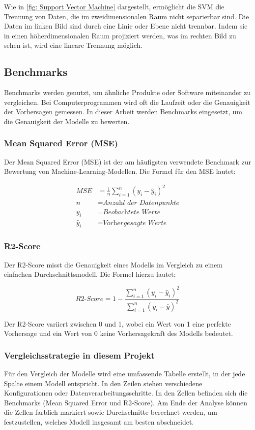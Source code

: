Wie in \autoref{fig: Support Vector Machine} dargestellt, ermöglicht die SVM die Trennung von Daten, die im zweidimensionalen Raum nicht separierbar sind. Die Daten im linken Bild sind durch eine Linie oder Ebene nicht trennbar. Indem sie in einen höherdimensionalen Raum projiziert werden, was im rechten Bild zu sehen ist, wird eine lineare Trennung möglich.

\subsection{Benchmarks}\label{sec: Benchmarks}
Benchmarks werden genutzt, um ähnliche Produkte oder Software miteinander zu vergleichen. Bei Computerprogrammen wird oft die Laufzeit oder die Genauigkeit der Vorhersagen gemessen. In dieser Arbeit werden Benchmarks eingesetzt, um die Genauigkeit der Modelle zu bewerten.

\subsubsection{Mean Squared Error (MSE)}
Der Mean Squared Error (MSE) ist der am häufigsten verwendete Benchmark zur Bewertung von Machine-Learning-Modellen. Die Formel für den MSE lautet:

\begin{align}
\textit{MSE} &= \frac{1}{n} \sum_{i=1}^{n} (y_i - \hat{y}_i)^2\\
n &= \textit{Anzahl der Datenpunkte}\\
y_i &= \textit{Beobachtete Werte}\\
\hat{y}_i &= \textit{Vorhergesagte Werte}
\end{align}

\subsubsection{R2-Score}
Der R2-Score misst die Genauigkeit eines Modells im Vergleich zu einem einfachen Durchschnittsmodell. Die Formel hierzu lautet:

\begin{equation}
\textit{R2-Score} = 1 - \frac{\sum_{i=1}^{n} (y_i - \hat{y}_i)^2}{\sum_{i=1}^{n} (y_i - \bar{y})^2}
\end{equation}

Der R2-Score variiert zwischen 0 und 1, wobei ein Wert von 1 eine perfekte Vorhersage und ein Wert von 0 keine Vorhersagekraft des Modells bedeutet.

\subsubsection{Vergleichsstrategie in diesem Projekt}
Für den Vergleich der Modelle wird eine umfassende Tabelle erstellt, in der jede Spalte einem Modell entspricht. In den Zeilen stehen verschiedene Konfigurationen oder Datenverarbeitungsschritte. In den Zellen befinden sich die Benchmarks (Mean Squared Error und R2-Score). Am Ende der Analyse können die Zellen farblich markiert sowie Durchschnitte berechnet werden, um festzustellen, welches Modell insgesamt am besten abschneidet.

